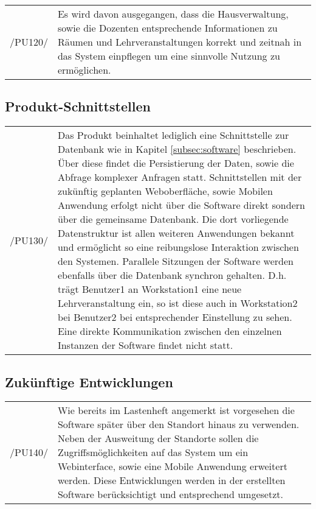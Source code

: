 \begin{tabular}{p{1.5cm}p{14.5cm}}

	 /PU120/	&  Es wird davon ausgegangen, dass die Hausverwaltung, sowie die Dozenten entsprechende Informationen zu Räumen und Lehrveranstaltungen korrekt und zeitnah in das System einpflegen um eine sinnvolle Nutzung zu ermöglichen.\\[0.25cm]


\end{tabular}




\subsection{Produkt-Schnittstellen}
\label{subsec:productinterface}

\begin{tabular}{p{1.5cm}p{14.5cm}}

	 /PU130/	&  Das Produkt beinhaltet lediglich eine Schnittstelle zur Datenbank wie in Kapitel \ref{subsec:software} beschrieben. Über diese findet die Persistierung der Daten, sowie die Abfrage komplexer Anfragen statt.
Schnittstellen mit der zukünftig geplanten Weboberfläche, sowie Mobilen Anwendung erfolgt nicht über die Software direkt sondern über die gemeinsame Datenbank. Die dort vorliegende Datenstruktur ist allen weiteren Anwendungen bekannt und ermöglicht so eine reibungslose Interaktion zwischen den Systemen.
Parallele Sitzungen der Software werden ebenfalls über die Datenbank synchron gehalten. D.h. trägt Benutzer1 an Workstation1 eine neue Lehrveranstaltung ein, so ist diese auch in Workstation2 bei Benutzer2 bei entsprechender Einstellung zu sehen. Eine direkte Kommunikation zwischen den einzelnen Instanzen der Software findet nicht statt.\\[0.25cm]


\end{tabular}



\subsection{Zukünftige Entwicklungen}
\label{subsec:zukunftentw}

\begin{tabular}{p{1.5cm}p{14.5cm}}

	 /PU140/	&  Wie bereits im Lastenheft angemerkt ist vorgesehen die Software später über den Standort hinaus zu verwenden.
Neben der Ausweitung der Standorte sollen die Zugriffsmöglichkeiten auf das System um ein Webinterface, sowie eine Mobile Anwendung erweitert werden.
Diese Entwicklungen werden in der erstellten Software berücksichtigt und entsprechend umgesetzt.\\[0.25cm]


\end{tabular}

